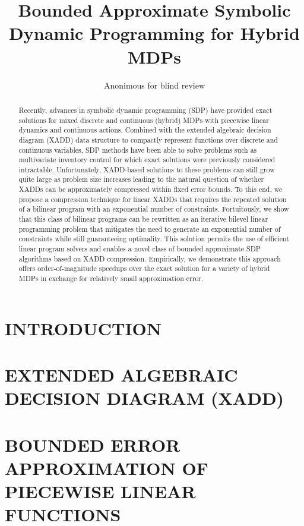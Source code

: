 \documentclass[]{article}
\title{	Bounded Approximate Symbolic Dynamic Programming for Hybrid MDPs }
\author{Anonimous for blind review}
\begin{document}
\maketitle

\begin{abstract}
Recently, advances in symbolic dynamic programming (SDP) have provided exact solutions for mixed discrete and continuous (hybrid) MDPs with piecewise linear dynamics and continuous actions. Combined with the extended algebraic decision diagram (XADD) data structure to compactly represent functions over discrete and continuous variables, SDP methods have been able to solve problems such as multivariate inventory control for which exact solutions were previously considered intractable. Unfortunately, XADD-based solutions to these problems can still grow quite large as problem size increases leading to the natural question of whether XADDs can be approximately compressed within fixed error bounds. To this end, we propose a compression technique for linear XADDs that requires the repeated solution of a bilinear program with an exponential number of constraints. Fortuitously, we show that this class of bilinear programs can be rewritten as an iterative bilevel linear programming problem that mitigates the need to generate an exponential number of constraints while still guaranteeing optimality. This solution permits the use of efficient linear program solvers and enables a novel class of bounded approximate SDP algorithms based on XADD compression. Empirically, we demonstrate this approach offers order-of-magnitude speedups over the exact solution for a variety of hybrid MDPs in exchange for relatively small approximation error.
\end{abstract}

\section{INTRODUCTION}



\section{EXTENDED ALGEBRAIC DECISION DIAGRAM (XADD)}



\section{BOUNDED ERROR APPROXIMATION OF PIECEWISE LINEAR FUNCTIONS}
\end{document}
